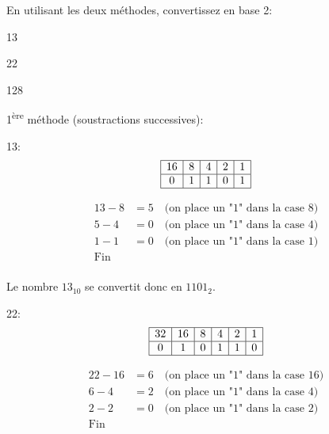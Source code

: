 \documentclass[12pt]{article}
\begin{document}
	\begin{MonExo}
		En utilisant les deux méthodes, convertissez en base 2:
		\begin{alphenum}
			\item 13
			\item 22
			\item 128
		\end{alphenum}
	\end{MonExo}
	\begin{MaReponse}
		1\textsuperscript{ère} méthode (soustractions successives):
		\begin{alphenum}
			\item 13:
				\[
				\begin{array}{|c|c|c|c|c|c|c|}
					\hline
					16 & 8 & 4 & 2 & 1 \\
					\hline
					0 & 1 & 1 & 0 & 1 \\
					\hline
				\end{array}
				\]
				
				\[
				\begin{array}{ll}
					13 - 8 &= 5 \quad \text{(on place un "1" dans la case \(8\))} \\
					5 - 4 &= 0 \quad \text{(on place un "1" dans la case \(4\))} \\
					1 - 1 &= 0 \quad \text{(on place un "1" dans la case \(1\))} \\
					\text{Fin} & \\
				\end{array}
				\]
				
				Le nombre \(13_{10}\) se convertit donc en \(1101_{2}\).
			\item 22:
				\[
				\begin{array}{|c|c|c|c|c|c|c|c|}
					\hline
					32 & 16 & 8 & 4 & 2 & 1 \\
					\hline
					0 & 1 & 0 & 1 & 1 &0\\
					\hline
				\end{array}
				\]
				
				\[
				\begin{array}{ll}
					22 - 16 &= 6 \quad \text{(on place un "1" dans la case \(16\))} \\
					6 - 4 &= 2 \quad \text{(on place un "1" dans la case \(4\))} \\
					2 - 2 &= 0 \quad \text{(on place un "1" dans la case \(2\))} \\
					\text{Fin} & \\
				\end{array}
				\]
				

\end{alphenum}
\end{MaReponse}
\end{document}
